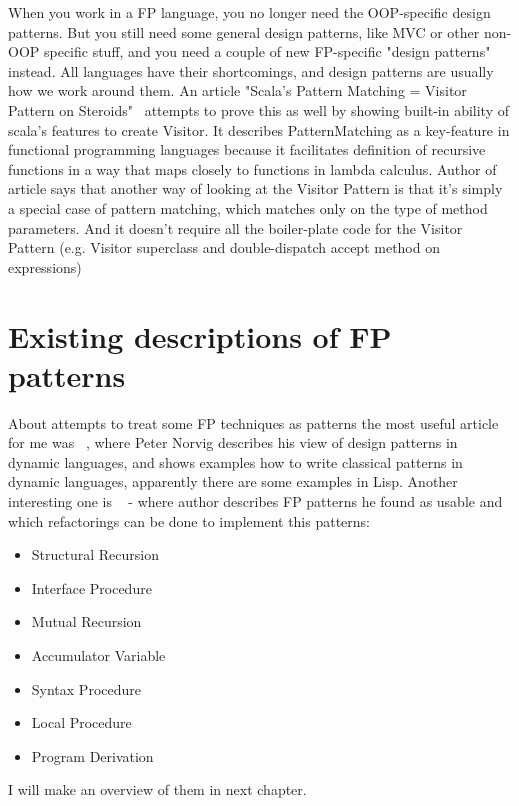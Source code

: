 When you work in a FP language, you no longer need the OOP-specific design patterns. But you still need some general design patterns, like MVC or other non-OOP specific stuff, and you need a couple of new FP-specific "design patterns" instead. All languages have their shortcomings, and design patterns are usually how we work around them.
An article "Scala's Pattern Matching = Visitor Pattern on Steroids"~\cite{res3} attempts to prove this as well by showing built-in ability of scala's features to create Visitor. It describes PatternMatching as a key-feature in functional programming languages because it facilitates definition of recursive functions in a way that maps closely to functions in lambda calculus. Author of article says that another way of looking at the Visitor Pattern is that it's simply a special case of pattern matching, which matches only on the type of method parameters. And it  doesn't require all the boiler-plate code for the Visitor Pattern (e.g. Visitor superclass and double-dispatch accept method on expressions)

\section{Existing descriptions of FP patterns}
About attempts to treat some FP techniques as patterns the most useful article for me was ~\cite{res15}, where Peter Norvig describes his view of design patterns in dynamic languages, and shows examples how to write classical patterns in dynamic languages, apparently there are some examples in Lisp.
Another interesting one is ~\cite{res6} - where author describes FP patterns he found as usable and which refactorings can be done to implement this patterns:

\begin{itemize}
	\item Structural Recursion
	\item Interface Procedure
	\item Mutual Recursion
	\item Accumulator Variable
	\item Syntax Procedure
	\item Local Procedure
	\item Program Derivation
\end{itemize}

I will make an overview of them in next chapter.

